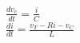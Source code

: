 \documentclass[preview]{standalone}
\begin{document}
\begin{center}
$\frac{dv_c}{dt} = \frac{i}{C}$ \\
                                $\frac{di}{dt} = \frac{v_T - Ri - v_C}{L}$
\end{center}
\end{document}
